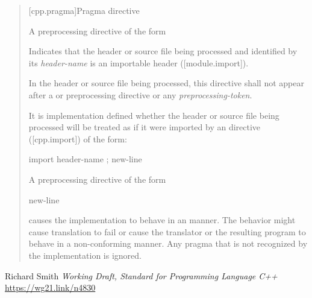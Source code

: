 \documentclass{wg21}
\begin{document}
\begin{quote}
[cpp.pragma]{Pragma directive}%
%

\begin{addedblock}
\pnum
A preprocessing directive of the form\\
\begin{ncsimplebnf}
\end{ncsimplebnf}
Indicates that the header or source file being processed and identified by its \emph{header-name} is an importable header ([module.import]).

In the header or source file being processed, this directive shall not appear after a  or  preprocessing directive or any \emph{preprocessing-token}.

\begin{note}
It is implementation defined whether the header or source file being processed will be treated as if it were imported by an  directive ([cpp.import]) of the form:

\begin{ncsimplebnf}
    import header-name ; new-line
\end{ncsimplebnf}
\end{note}

\end{addedblock}

\pnum
A preprocessing directive of the form\\
\begin{ncsimplebnf}
  new-line
\end{ncsimplebnf}
causes the implementation to behave
in an  manner.
The behavior might cause translation to fail or cause the translator or
the resulting program to behave in a non-conforming manner.
Any pragma that is not recognized by the implementation is ignored.

\end{quote}

 
\begin{thebibliography}{9}
    
    Richard Smith
    \emph{Working Draft, Standard for Programming Language C++}\newline
    \url{https://wg21.link/n4830}
    
\end{thebibliography}
\end{document}
